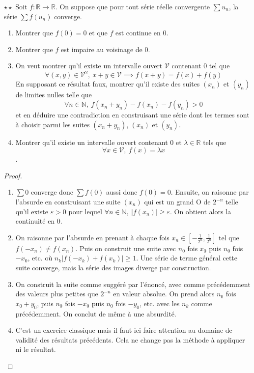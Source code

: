 \documentclass[french,a4paper]{article}
\newcommand{\N}{\mathbb{N}}
\newcommand{\R}{\mathbb{R}}
\theoremstyle{plain}
\theoremstyle{definition}
\theoremstyle{remark}
\begin{document}
\begin{ex}{$\star\star$}
	Soit $f:\R\to\R$. On suppose que pour tout série réelle convergente $\sum u_n$, la série $\sum f(u_n)$ converge.
	\begin{enumerate}
		\item Montrer que $f(0)=0$ et que $f$ est continue en $0$.
		\item Montrer que $f$ est impaire au voisinage de $0$.
		\item On veut montrer qu'il existe un intervalle ouvert $\mathcal{V}$ contenant $0$ tel que $$\forall (x,y)\in\mathcal{V}^2,\ x+y\in\mathcal{V}\implies f(x+y)=f(x)+f(y)$$ En supposant ce résultat faux, montrer qu'il existe des suites $(x_n)$ et $(y_n)$ de limites nulles telle que $$\forall n\in\N,\ f(x_n+y_n)-f(x_n)-f(y_n)>0$$ et en déduire une contradiction en construisant une série dont les termes sont à choisir parmi les suites $(x_n+y_n)$, $(x_n)$ et $(y_n)$.
		\item Montrer qu'il existe un intervalle ouvert contenant $0$ et $\lambda\in\R$ tels que $$\forall x\in\mathcal{V},\ f(x)=\lambda x$$.
	\end{enumerate}
\end{ex}
\begin{proof}
	\begin{enumerate}
		\item $\sum 0$ converge donc $\sum f(0)$ aussi donc $f(0)=0$. Ensuite, on raisonne par l'absurde en construisant une suite $(x_n)$ qui est un grand O de $2^{-n}$ telle qu'il existe $\varepsilon>0$ pour lequel $\forall n\in\N,\ \lvert f(x_n)\rvert\geqslant\varepsilon$. On obtient alors la continuité en $0$.
		\item On raisonne par l'absurde en prenant à chaque fois $x_n\in\displaystyle\left[-\frac{1}{2^n},\frac{1}{2^n}\right]$ tel que $f(-x_n)\ne f(x_n)$. Puis on construit une suite avec $n_0$ fois $x_0$ puis $n_0$ fois $-x_0$, etc. où $n_k\lvert f(-x_k)+f(x_k)\rvert\geqslant1$. Une série de terme général cette suite converge, mais la série des images diverge par construction.
		\item On construit la suite comme suggéré par l'énoncé, avec comme précédemment des valeurs plus petites que $2^{-n}$ en valeur absolue. On prend alors $n_0$ fois $x_0+y_0$, puis $n_0$ fois $-x_0$ puis $n_0$ fois $-y_0$, etc. avec les $n_k$ comme précédemment. On conclut de même à une absurdité.
		\item C'est un exercice classique mais il faut ici faire attention au domaine de validité des résultats précédents. Cela ne change pas la méthode à appliquer ni le résultat.
	\end{enumerate}
\end{proof}
\end{document}
